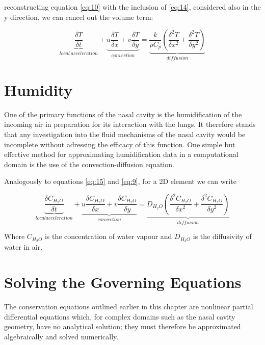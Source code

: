     reconstructing equation \ref{eq:10} with the inclusion of \ref{eq:14}, considered also in the y direction, we can cancel out the volume term:

    \begin{equation} \label{eq:15}
      \underbrace{\frac{\delta T}{\delta t}}_{local\ acceleration} + \underbrace{u \frac{\delta T}{\delta x} + v \frac{\delta T}{\delta y}}_{convection} = \underbrace{\frac{k}{\rho C_{p}} ( \frac{\delta^2 T}{\delta x^2} + \frac{\delta^2 T}{\delta y^2} )}_{diffusion}
    \end{equation}

\section{Humidity}

One of the primary functions of the nasal cavity is the humidification of the incoming air in preparation for its interaction with the lungs. It therefore stands that any investigation into the fluid mechanisms of the nasal cavity would be incomplete without adressing the efficacy of this function. One simple but effective method for approximating humidification data in a computational domain is the use of the convection-diffusion equation.

Analogously to equations \ref{eq:15} and \ref{eq:9}, for a 2D element we can write

\begin{equation} \label{eq:16}
  \underbrace{\frac{\delta C_{H_{2} O}}{\delta t}}_{local acceleration} + \underbrace{u \frac{\delta C_{H_{2} O}}{\delta x} + v \frac{\delta C_{H_{2} O}}{\delta y}}_{convection} = \underbrace{D_{H_{2} O} ( \frac{\delta^2 C_{H_{2} O}}{\delta x^2} + \frac{\delta^2 C_{H_{2} O}}{\delta y^2} )}_{diffusion}
\end{equation} \nocite{Naftali1998}

Where $C_{H_{2} O}$ is the concentration of water vapour and $D_{H_{2} O}$ is the diffusivity of water in air.

\section{Solving the Governing Equations}

The conservation equations outlined earlier in this chapter are nonlinear partial differential equations which, for complex domains such as the nasal cavity geometry, have no analytical solution; they must therefore be approximated algebraically and solved numerically.

